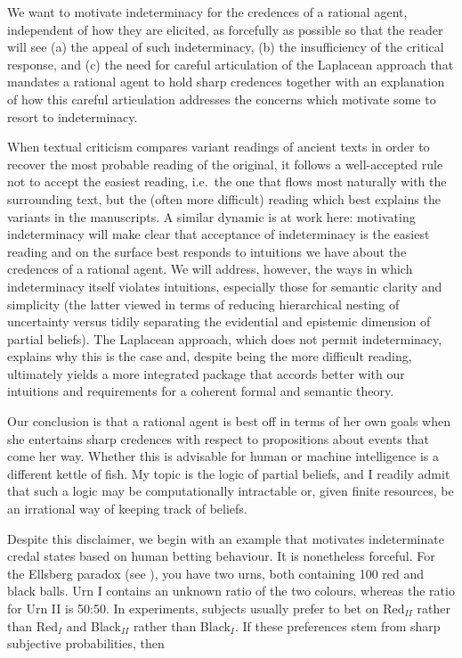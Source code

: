 We want to motivate indeterminacy for the credences of a rational agent, independent of how they are elicited, as forcefully as possible so that the reader will see (a) the appeal of such indeterminacy, (b) the insufficiency of the critical response, and (c) the need for careful articulation of the Laplacean approach that mandates a rational agent to hold sharp credences together with an explanation of how this careful articulation addresses the concerns which motivate some to resort to indeterminacy.

When textual criticism compares variant readings of ancient texts in order to recover the most probable reading of the original, it follows a well-accepted rule not to accept the easiest reading, i.e.\ the one that flows most naturally with the surrounding text, but the (often more difficult) reading which best explains the variants in the manuscripts. A similar dynamic is at work here: motivating indeterminacy will make clear that acceptance of indeterminacy is the easiest reading and on the surface best responds to intuitions we have about the credences of a rational agent. We will address, however, the ways in which indeterminacy itself violates intuitions, especially those for semantic clarity and simplicity (the latter viewed in terms of reducing hierarchical nesting of uncertainty versus tidily separating the evidential and epistemic dimension of partial beliefs). The Laplacean approach, which does not permit indeterminacy, explains why this is the case and, despite being the more difficult reading, ultimately yields a more integrated package that accords better with our intuitions and requirements for a coherent formal and semantic theory.

Our conclusion is that a rational agent is best off in terms of her own goals when she entertains sharp credences with respect to propositions about events that come her way. Whether this is advisable for human or machine intelligence is a different kettle of fish. My topic is the logic of partial beliefs, and I readily admit that such a logic may be computationally intractable or, given finite resources, be an irrational way of keeping track of beliefs.

Despite this disclaimer, we begin with an example that motivates indeterminate credal states based on human betting behaviour. It is nonetheless forceful. For the Ellsberg paradox (see ), you have two urns, both containing 100 red and black balls. Urn I contains an unknown ratio of the two colours, whereas the ratio for Urn II is 50:50. In experiments, subjects usually prefer to bet on Red$_{II}$ rather than Red$_{I}$ and Black$_{II}$ rather than Black$_{I}$. If these preferences stem from sharp subjective probabilities, then

